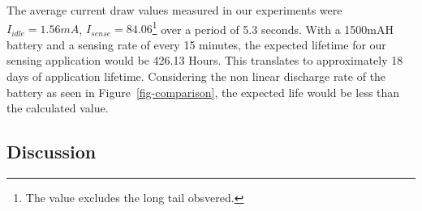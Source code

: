 The average current draw values measured in our experiments were $I_{idle}=1.56mA$, $I_{sense}=84.06$\footnote{The value excludes the long tail obsvered.} over a period of 5.3 seconds. With a 1500mAH battery and a sensing rate of every 15 minutes, the expected lifetime for our sensing application would be 426.13 Hours. This translates to approximately 18 days of application lifetime. Considering the non linear discharge rate of the battery as seen in Figure~\ref{fig-comparison}, the expected life would be less than the calculated value.


%

\subsection{Discussion}




